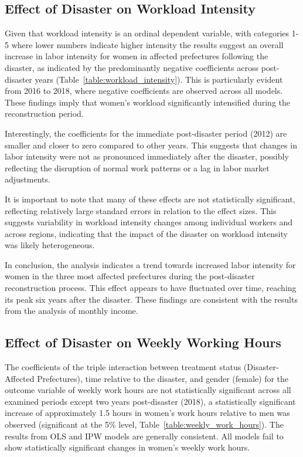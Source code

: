 \documentclass[a4paper,12pt]{article}
\begin{document}
\subsection{Effect of Disaster on Workload Intensity}

Given that workload intensity is an ordinal dependent variable, with categories 1-5 where lower numbers indicate higher intensity the results suggest an overall increase in labor intensity for women in affected prefectures following the disaster, as indicated by the predominantly negative coefficients across post-disaster years (Table~\ref{table:workload_intensity}). This is particularly evident from 2016 to 2018, where negative coefficients are observed across all models. These findings imply that women's workload significantly intensified during the reconstruction period.

Interestingly, the coefficients for the immediate post-disaster period (2012) are smaller and closer to zero compared to other years. This suggests that changes in labor intensity were not as pronounced immediately after the disaster, possibly reflecting the disruption of normal work patterns or a lag in labor market adjustments.

It is important to note that many of these effects are not statistically significant, reflecting relatively large standard errors in relation to the effect sizes. This suggests variability in workload intensity changes among individual workers and across regions, indicating that the impact of the disaster on workload intensity was likely heterogeneous.

In conclusion, the analysis indicates a trend towards increased labor intensity for women in the three most affected prefectures during the post-disaster reconstruction process. This effect appears to have fluctuated over time, reaching its peak six years after the disaster. These findings are consistent with the results from the analysis of monthly income.


\subsection{Effect of Disaster on Weekly Working Hours}

The coefficients of the triple interaction between treatment status (Disaster-Affected Prefectures), time relative to the disaster, and gender (female) for the outcome variable of weekly work hours are not statistically significant across all examined periods except two years post-disaster (2018), a statistically significant increase of approximately 1.5 hours in women's work hours relative to men was observed (significant at the 5\% level, Table~\ref{table:weekly_work_hours}). The results from OLS and IPW models are generally consistent. All models fail to show statistically significant changes in women's weekly work hours.
\end{document}
